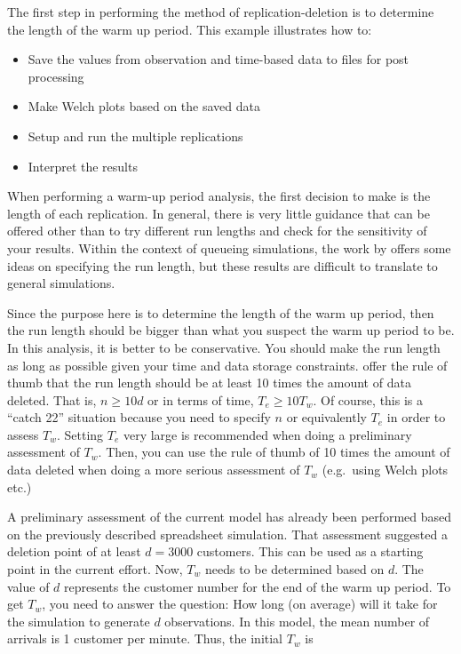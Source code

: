\documentclass[
]{book}
\theoremstyle{definition}
\theoremstyle{definition}
\theoremstyle{definition}
\theoremstyle{definition}
\theoremstyle{remark}
\begin{document}
The first step in performing the method of replication-deletion is to
determine the length of the warm up period. This example illustrates how
to:

\begin{itemize}
\item
  Save the values from observation and time-based data to files for
  post processing
\item
  Make Welch plots based on the saved data
\item
  Setup and run the multiple replications
\item
  Interpret the results
\end{itemize}

When performing a warm-up period analysis, the first decision to make is
the length of each replication. In general, there is very little
guidance that can be offered other than to try different run lengths and
check for the sensitivity of your results. Within the context of
queueing simulations, the work by \citep{whitt1989planning} offers some ideas
on specifying the run length, but these results are difficult to
translate to general simulations.

Since the purpose here is to determine the length of the warm up period,
then the run length should be bigger than what you suspect the warm up
period to be. In this analysis, it is better to be conservative. You
should make the run length as long as possible given your time and data
storage constraints. \citet{banks2005discreteevent} offer the rule of thumb
that the run length should be at least 10 times the amount of data
deleted. That is, \(n \geq 10d\) or in terms of time, \(T_e \geq 10T_w\). Of
course, this is a ``catch 22'' situation because you need to specify \(n\)
or equivalently \(T_e\) in order to assess \(T_w\). Setting \(T_e\) very large
is recommended when doing a preliminary assessment of \(T_w\). Then, you
can use the rule of thumb of 10 times the amount of data deleted when
doing a more serious assessment of \(T_w\) (e.g.~using Welch plots etc.)

A preliminary assessment of the current model has already been performed
based on the previously described spreadsheet simulation. That
assessment suggested a deletion point of at least \(d = 3000\) customers.
This can be used as a starting point in the current effort. Now, \(T_w\)
needs to be determined based on \(d\). The value of \(d\) represents the
customer number for the end of the warm up period. To get \(T_w\), you
need to answer the question: How long (on average) will it take for the
simulation to generate \(d\) observations. In this model, the mean number
of arrivals is 1 customer per minute. Thus, the initial \(T_w\) is
\end{document}
